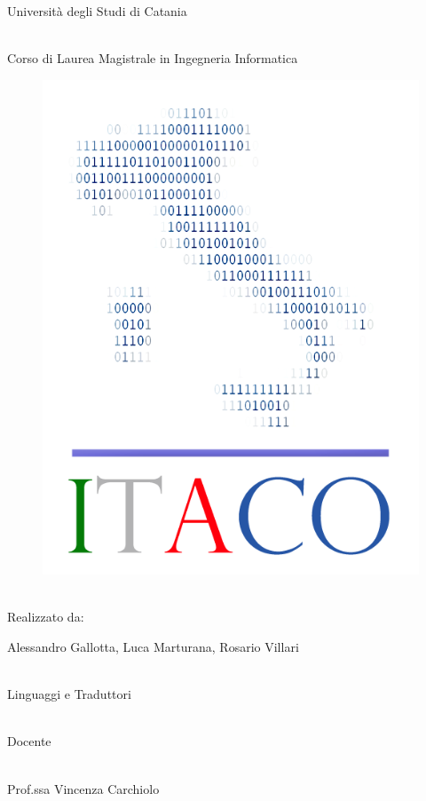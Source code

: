 \documentclass[11pt, a4paper, twoside, notitlepage]{report}
\begin{document}
\begin{center}
\begin{Large}
Università degli Studi di Catania
\end{Large}
\begin{large}
\\Corso di Laurea Magistrale in Ingegneria Informatica
\end{large}
\vspace{30pt}

\begin{figure}[h] \hspace*{130pt}
\includegraphics[scale=0.35]{img/itaco_logo2.png}
\end{figure}
\vspace{30pt}
\\Realizzato da:

\begin{Large}
Alessandro Gallotta, Luca Marturana, Rosario Villari
\end{Large}
\vspace{30pt}

\begin{large}
\\Linguaggi e Traduttori
\end{large}
\\Docente
\begin{Large}
\\Prof.ssa Vincenza Carchiolo
\end{Large}

\vspace{20pt}
\vfill
\end{center}
\end{document}
